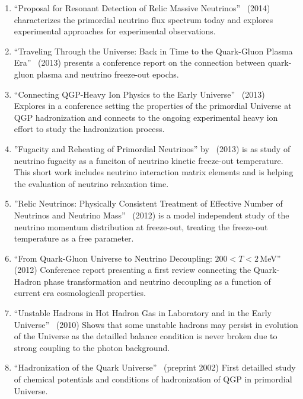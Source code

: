 \begin{enumerate}
%
\item ``Proposal for Resonant Detection of Relic Massive Neutrinos''~\cite{Birrell:2014qna} (2014) characterizes the primordial neutrino flux spectrum today and explores experimental approaches for experimental observations.
%
\item ``Traveling Through the Universe: Back in Time to the Quark-Gluon Plasma Era''~\cite{Rafelski:2013yka} (2013) presents a conference report on the connection between quark-gluon plasma and neutrino freeze-out epochs.
%
\item ``Connecting QGP-Heavy Ion Physics to the Early Universe''~\cite{Rafelski:2013qeu} (2013) Explores in a conference setting the properties of the primordial Universe at QGP hadronization and connects to the ongoing experimental heavy ion effort to study the hadronization process.
%
\item ''Fugacity and Reheating of Primordial Neutrinos'' by~\cite{Birrell:2013gpa} (2013) is as study of neutrino fugacity as a funciton of neutrino kinetic freeze-out temperature. This short work includes neutrino interaction matrix  elements and is helping the evaluation of  neutrino relaxation time. 
%
\item ''Relic Neutrinos: Physically Consistent Treatment of Effective Number of Neutrinos and Neutrino Mass''~\cite{Birrell:2012gg}  (2012) is a model independent study of the neutrino momentum distribution at freeze-out, treating the freeze-out temperature as a free parameter.
%
\item ``From Quark-Gluon Universe to Neutrino Decoupling: $200 < T < 2$\,MeV''~\cite{Fromerth:2012fe} (2012) Conference report presenting a first review connecting  the Quark-Hadron phase transformation and neutrino decoupling as a function of current era cosmologicall properties.
%
\item ``Unstable Hadrons in Hot Hadron Gas in Laboratory and in the Early Universe''~\cite{Kuznetsova:2010pi} (2010) Shows that some unstable hadrons may persist in evolution of the Universe as the detailled balance condition is never broken due to strong coupling to the photon background.
%
\item ``Hadronization of the Quark Universe''~\cite{Fromerth:2002wb} (preprint 2002) First detailled study of chemical potentials and conditions of hadronization of QGP in primordial Universe.
%
\end{enumerate}

